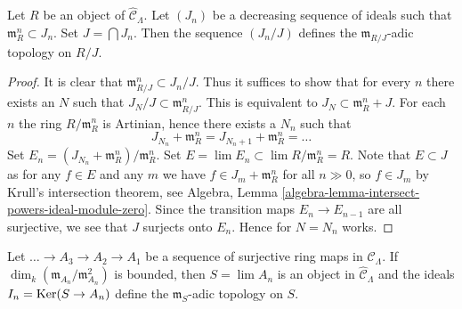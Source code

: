 \begin{lemma}
\label{lemma-m-adic-topology}
Let $R$ be an object of $\widehat{\mathcal{C}}_\Lambda$. Let $(J_n)$ be a
decreasing sequence of ideals such that $\mathfrak m_R^n \subset J_n$.
Set $J = \bigcap J_n$. Then the sequence $(J_n/J)$ defines the
$\mathfrak m_{R/J}$-adic topology on $R/J$.
\end{lemma}

\begin{proof}
It is clear that $\mathfrak m_{R/J}^n \subset J_n/J$. Thus it suffices
to show that for every $n$ there exists an $N$ such that
$J_N/J \subset \mathfrak m_{R/J}^n$. This is equivalent to
$J_N \subset \mathfrak m_R^n + J$. For each $n$ the ring $R/\mathfrak m_R^n$
is Artinian, hence there exists a $N_n$ such that
$$
J_{N_n} + \mathfrak m_R^n = J_{N_n + 1} + \mathfrak m_R^n = \ldots
$$
Set $E_n = (J_{N_n} + \mathfrak m_R^n)/\mathfrak m_R^n$.
Set $E = \lim E_n \subset \lim R/\mathfrak m_R^n = R$.
Note that $E \subset J$ as for any $f \in E$ and any $m$
we have $f \in J_m + \mathfrak m_R^n$ for all $n \gg 0$, so
$f \in J_m$ by Krull's intersection theorem, see
Algebra, Lemma \ref{algebra-lemma-intersect-powers-ideal-module-zero}.
Since the transition maps $E_n \to E_{n - 1}$ are all surjective,
we see that $J$ surjects onto $E_n$. Hence for $N = N_n$ works.
\end{proof}

\begin{lemma}
\label{lemma-limit-artinian}
Let $\ldots \to A_3 \to A_2 \to A_1$ be a sequence of surjective
ring maps in $\mathcal{C}_\Lambda$. If
$\dim_k (\mathfrak m_{A_n}/\mathfrak m_{A_n}^2)$ is bounded, then
$S = \lim A_n$ is an object in $\widehat{\mathcal{C}}_\Lambda$
and the ideals $I_n = \mathop{\mathrm{Ker}}(S \to A_n)$ define the
$\mathfrak m_S$-adic topology on $S$.
\end{lemma}

